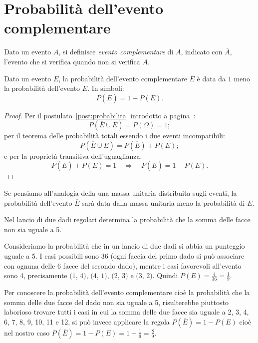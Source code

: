 \vspazio\ovalbox{\risolvii \ref{ese:9.6}, \ref{ese:9.7}, \ref{ese:9.28}, \ref{ese:9.29}, \ref{ese:9.30}, \ref{ese:9.31}, \ref{ese:9.32}, \ref{ese:9.33}, \ref{ese:9.34}, \ref{ese:9.35}, \ref{ese:9.36},}

\ovalbox{\ref{ese:9.37} \ref{ese:9.38}}

\section{Probabilità dell'evento complementare }

\begin{definizione}
Dato un evento $A$, si definisce \emph{evento complementare} di $A$, indicato con $\overline A$, l'evento che si verifica quando non si verifica $A$.
\end{definizione}

\begin{teorema}
Dato un evento $E$, la probabilità dell'evento complementare $\overline E$ è data da $1$ meno la probabilità dell'evento $E$. In simboli: \[ P(\overline E)=1-P(E). \]
\end{teorema}
\begin{proof} Per il postulato~\ref{post:probabilita} introdotto a pagina~\pageref{post:probabilita}: \[ P(\overline E\cup E)=P(\Omega)=1; \]
per il teorema delle probabilità totali essendo i due eventi incompatibili: \[ P(\overline E\cup E)=P(\overline E)+P(E); \]
e per la proprietà transitiva dell'uguaglianza: \[ P(\overline E)+P(E)=1 \quad\Rightarrow\quad P(\overline E)=1-P(E). \]
\end{proof}

Se pensiamo all'analogia della una massa unitaria distribuita sugli eventi, la probabilità dell'evento $\overline E$ sarà data dalla massa unitaria meno la probabilità di $E$.

\begin{exrig}
\begin{esempio}
Nel lancio di due dadi regolari determina la probabilità che la somma delle facce non sia uguale a 5.

Consideriamo la probabilità che in un lancio di due dadi si abbia un punteggio uguale a 5. I casi possibili sono 36 (ogni faccia del primo dado si può associare con ognuna delle 6 facce del secondo dado), mentre i casi favorevoli all'evento sono 4, precisamente $(1$, $4)$, $(4$, $1)$, $(2$, $3)$ e $(3$, $2)$. Quindi $P(E)=\frac 4{36}=\frac 1 9$.

Per conoscere la probabilità dell'evento complementare cioè la probabilità che la somma delle due facce del dado non sia uguale a 5, risulterebbe piuttosto laborioso trovare tutti i casi in cui la somma delle due facce sia uguale a 2, 3, 4, 6, 7, 8, 9, 10, 11 e 12, si può invece applicare la regola $P(\overline E)=1-P(E)$ cioè nel nostro caso $P(\overline E)=1-P(E)=1-\frac 1 9=\frac 8 9$.
\end{esempio}
\end{exrig}

